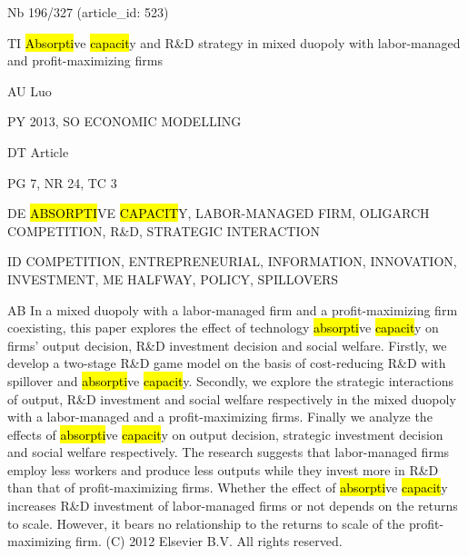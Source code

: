 \documentclass[a4paper]{article}
\begin{document}
\vspace*{-2cm}
Nb \tabto{0cm}196/327 (article\_id: 523)\par
TI \tabto{0cm}\hl{Absorpti}ve \hl{capacit}y and R\&D strategy in mixed duopoly with labor-managed and profit-maximizing firms\par
AU \tabto{0cm}Luo\par
PY \tabto{0cm}2013, SO ECONOMIC MODELLING\par
DT \tabto{0cm}Article\par
PG \tabto{0cm}7, NR 24, TC 3\par
DE \tabto{0cm}\hl{ABSORPTI}VE \hl{CAPACIT}Y, LABOR-MANAGED FIRM, OLIGARCH COMPETITION, R\&D, STRATEGIC INTERACTION\par
ID \tabto{0cm}COMPETITION, ENTREPRENEURIAL, INFORMATION, INNOVATION, INVESTMENT, ME HALFWAY, POLICY, SPILLOVERS\par
AB \tabto{0cm}In a mixed duopoly with a labor-managed firm and a profit-maximizing firm coexisting, this paper explores the effect of technology \hl{absorpti}ve \hl{capacit}y on firms' output decision, R\&D investment decision and social welfare. Firstly, we develop a two-stage R\&D game model on the basis of cost-reducing R\&D with spillover and \hl{absorpti}ve \hl{capacit}y. Secondly, we explore the strategic interactions of output, R\&D investment and social welfare respectively in the mixed duopoly with a labor-managed and a profit-maximizing firms. Finally we analyze the effects of \hl{absorpti}ve \hl{capacit}y on output decision, strategic investment decision and social welfare respectively. The research suggests that labor-managed firms employ less workers and produce less outputs while they invest more in R\&D than that of profit-maximizing firms. Whether the effect of \hl{absorpti}ve \hl{capacit}y increases R\&D investment of labor-managed firms or not depends on the returns to scale. However, it bears no relationship to the returns to scale of the profit-maximizing firm. (C) 2012 Elsevier B.V. All rights reserved.\par
\clearpage
\end{document}
